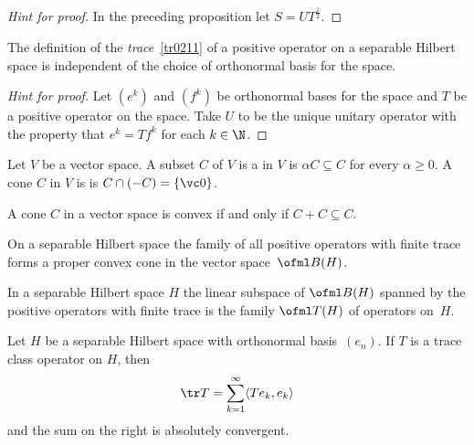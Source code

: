 \begin{proof}[\emph{Hint for proof}] In the preceding proposition let $S = UT^{\frac12}$.    \ns
\end{proof}

\begin{prop}\label{tr0224} The definition of the \emph{trace}~\ref{tr0211} of a positive operator on a separable Hilbert space is independent
of the choice of orthonormal basis for the space.
\end{prop}

\begin{proof}[\emph{Hint for proof}] Let $(e^k)$ and $(f^k)$ be orthonormal bases for the space and $T$ be a positive operator
on the space.  Take $U$ to be the unique unitary operator with the property that $e^k = Tf^k$ for each $k \in \N$.  \ns
\end{proof}

\begin{defn} Let $V$ be a vector space.  A subset $C$ of $V$ is a
 in $V$ is $\alpha C \subseteq C$ for every $\alpha \ge 0$.  A cone $C$ in $V$ is
 is $C \cap (-C) = \{\vc 0\}$.
\end{defn}

 \begin{prop} A cone $C$ in a vector space is convex if and only if $C + C \subseteq C$.
\end{prop}

\begin{exam} On a separable Hilbert space the family of all positive operators with finite trace forms a proper convex cone in the vector
space~$\ofml B(H)$.
\end{exam}

\begin{defn} In a separable Hilbert space $H$ the linear subspace of $\ofml B(H)$ spanned by the positive operators with finite trace
is the family $\ofml T(H)$ of
 operators on~$H$.
\end{defn}

\begin{prop} Let $H$ be a separable Hilbert space with orthonormal basis~$(e_n)$.  If $T$ is a trace class operator on $H$, then
   \[ \tr T = \sum_{k=1}^\infty \langle Te_k,e_k \rangle \]
and the sum on the right is absolutely convergent.
\end{prop}
















